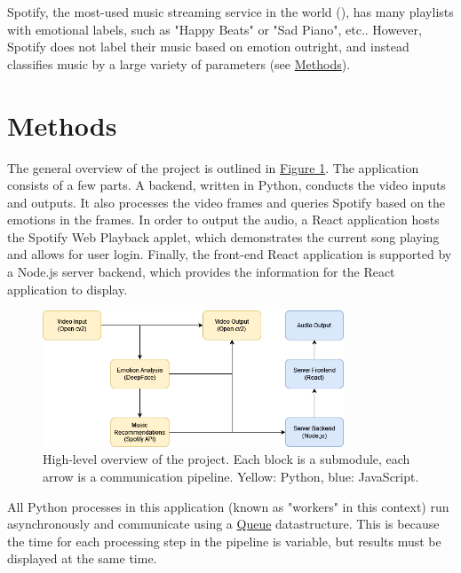 \documentclass{article}
\renewcommand{\_}[1]{\underline{ #1 }}
\theoremstyle{definition}
\begin{document}
Spotify, the most-used music streaming service in the world (\cite{mulligan2022}), has many playlists with emotional labels, such as "Happy Beats" or "Sad Piano", etc.. However, Spotify does not label their music based on emotion outright, and instead classifies music by a large variety of parameters (see \hyperref[Methods]{Methods}). 



\section[Methods]{Methods}
\label{Methods}

The general overview of the project is outlined in \hyperref[fig1]{Figure 1}. The application consists of a few parts. A backend, written in Python, conducts the video inputs and outputs. It also processes the video frames and queries Spotify based on the emotions in the frames. In order to output the audio, a React application hosts the Spotify Web Playback applet, which demonstrates the current song playing and allows for user login. Finally, the front-end React application is supported by a Node.js server backend, which provides the information for the React application to display. 

\begin{figure}[h]
    \centering
    \includegraphics[width=0.8\textwidth]{FtM Project.drawio.png}
    \begin{centering}
        \caption{High-level overview of the project. Each block is a submodule, each arrow is a communication pipeline. Yellow: Python, blue: JavaScript.}
    \end{centering}
    \label{fig1}
\end{figure}

All Python processes in this application (known as "workers" in this context) run asynchronously and communicate using a \href{https://docs.python.org/3/library/queue.html}{Queue} datastructure. This is because the time for each processing step in the pipeline is variable, but results must be displayed at the same time. 
\end{document}
